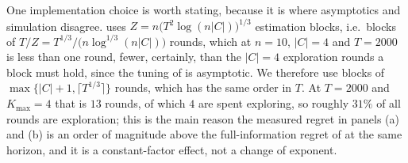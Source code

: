 \documentclass[letterpaper,9pt,twocolumn]{extarticle}
\newcommand{\Kmax}{K_{\max}}
\theoremstyle{plain}
\theoremstyle{definition}
\theoremstyle{remark}
\begin{document}
One implementation choice is worth stating, because it is where asymptotics
and simulation disagree.  uses
$Z=n\bigl(T^{2}\log(n|C|)\bigr)^{1/3}$ estimation blocks, i.e.\ blocks of
$T/Z=T^{1/3}/\bigl(n\log^{1/3}(n|C|)\bigr)$ rounds, which at $n=10$, $|C|=4$
and $T=2000$ is less than one round, fewer, certainly, than the $|C|=4$
exploration rounds a block must hold, since the tuning of \citet[Theorem
6.1]{balcan2015} is asymptotic. We therefore use blocks of
$\max\{|C|+1,\lceil T^{1/3}\rceil\}$ rounds, which has the same order in
$T$. At $T=2000$ and $\Kmax=4$ that is $13$ rounds, of which $4$ are spent
exploring, so roughly $31\%$ of all rounds are exploration; this is the main
reason the measured regret in panels (a) and (b) is an order of magnitude
above the full-information regret of  at the same
horizon, and it is a constant-factor effect, not a change of exponent.
\end{document}
